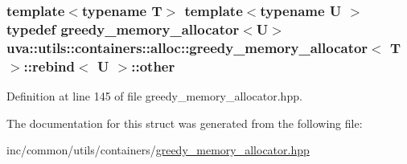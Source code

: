 \subsubsection[{other}]{\setlength{\rightskip}{0pt plus 5cm}template$<$typename T$>$ template$<$typename U $>$ typedef {\bf greedy\+\_\+memory\+\_\+allocator}$<$U$>$ {\bf uva\+::utils\+::containers\+::alloc\+::greedy\+\_\+memory\+\_\+allocator}$<$ T $>$\+::{\bf rebind}$<$ U $>$\+::{\bf other}}\label{structuva_1_1utils_1_1containers_1_1alloc_1_1greedy__memory__allocator_1_1rebind_acb518823bdcac17f79ad4ef0273b5186}


Definition at line 145 of file greedy\+\_\+memory\+\_\+allocator.\+hpp.



The documentation for this struct was generated from the following file\+:\begin{DoxyCompactItemize}
\item 
inc/common/utils/containers/\hyperlink{greedy__memory__allocator_8hpp}{greedy\+\_\+memory\+\_\+allocator.\+hpp}\end{DoxyCompactItemize}
